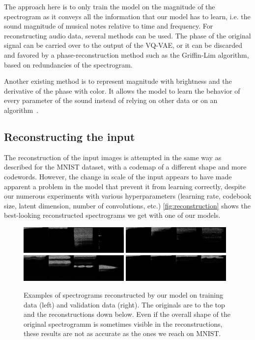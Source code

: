 \documentclass{article}
\begin{document}
The approach here is to only train the model on the magnitude of the spectrogram as it conveys all the information that our model has to learn, i.e. the sound magnitude of musical notes relative to time and frequency. For reconstructing audio data, several methods can be used. The phase of the original signal can be carried over to the output of the VQ-VAE, or it can be discarded and favored by a phase-reconstruction method such as the Griffin-Lim algorithm, based on redundancies of the spectrogram.

Another existing method is to represent magnitude with brightness and the derivative of the phase with color. It allows the model to learn the behavior of every parameter of the sound instead of relying on other data or on an algorithm~\cite{NSynth}. 

\subsection{Reconstructing the input}
The reconstruction of the input images is attempted in the same way as described for the MNIST dataset, with a codemap of a different shape and more codewords. However, the change in scale of the input appears to have made apparent a problem in the model that prevent it from learning correctly, despite our numerous experiments with various hyperparameters (learning rate, codebook size, latent dimension, number of convolutions, etc.) \autoref{fig:reconstruction} shows the best-looking reconstructed spectrograms we get with one of our models.

\begin{figure}
    \centering
    \includegraphics[width=0.48\textwidth]{figs/zot1.png}
    \includegraphics[width=0.48\textwidth]{figs/zov1.png}
    \includegraphics[width=0.48\textwidth]{figs/zrt1.png}
    \includegraphics[width=0.48\textwidth]{figs/zrv1.png}
    \caption{Examples of spectrograms reconstructed by our model on training data (left) and validation data (right). The originals are to the top and the reconstructions down below. Even if the overall shape of the original spectrogramm is sometimes visible in the reconstructions, these results are not as accurate as the ones we reach on MNIST.}
    \label{fig:reconstruction}
\end{figure}
\end{document}

